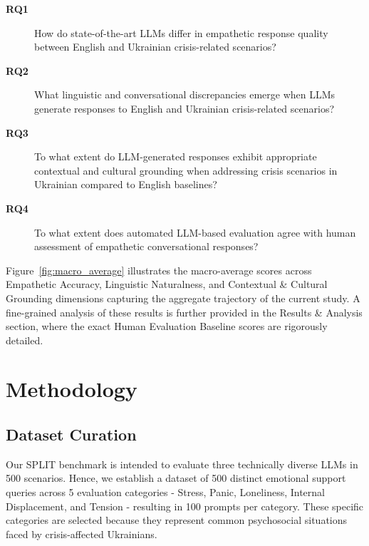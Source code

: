 \documentclass[10pt, twocolumn]{article}
\begin{document}
\begin{description}
    \item[\textbf{RQ1}] How do state-of-the-art LLMs differ in empathetic response quality between English and Ukrainian crisis-related scenarios?
    \item[\textbf{RQ2}] What linguistic and conversational discrepancies emerge when LLMs generate responses to English and Ukrainian crisis-related scenarios?
    \newpage
    \item[\textbf{RQ3}] To what extent do LLM-generated responses exhibit appropriate contextual and cultural grounding when addressing crisis scenarios in Ukrainian compared to English baselines?
    \item[\textbf{RQ4}] To what extent does automated LLM-based evaluation agree with human assessment of empathetic conversational responses?
\end{description}


Figure~\ref{fig:macro_average} illustrates the macro-average scores across Empathetic Accuracy, Linguistic Naturalness, and Contextual \& Cultural Grounding dimensions capturing the aggregate trajectory of the current study. A fine-grained analysis of these results is further provided in the Results \& Analysis section, where the exact Human Evaluation Baseline scores are rigorously detailed.



\section{Methodology}
\subsection{Dataset Curation}
Our SPLIT benchmark is intended to evaluate three technically diverse LLMs in 500 scenarios. Hence, we establish a dataset of 500 distinct emotional support  queries across 5 evaluation categories - Stress, Panic, Loneliness, Internal Displacement, and Tension - resulting in 100 prompts per category. These specific categories are selected because they represent common psychosocial situations faced by crisis-affected Ukrainians.
\end{document}
